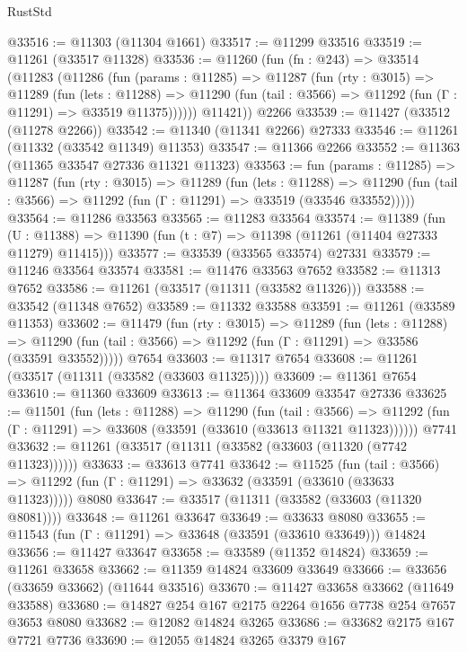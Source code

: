 \begin{lexlean}{RustStd}
\begin{coremodule}
@33516 := @11303 (@11304 @1661)
@33517 := @11299 @33516
@33519 := @11261 (@33517 @11328)
@33536 := @11260
    (fun (fn : @243) =>
    @33514
      (@11283
        (@11286
          (fun (params : @11285) =>
          @11287
            (fun (rty : @3015) =>
            @11289
              (fun (lets : @11288) =>
              @11290 (fun (tail : @3566) => @11292 (fun (Γ : @11291) => @33519 @11375))))))
        @11421))
    @2266
@33539 := @11427 (@33512 (@11278 @2266))
@33542 := @11340 (@11341 @2266) @27333
@33546 := @11261 (@11332 (@33542 @11349) @11353)
@33547 := @11366 @2266
@33552 := @11363 (@11365 @33547 @27336 @11321 @11323)
@33563 := fun (params : @11285) =>
  @11287
    (fun (rty : @3015) =>
    @11289
      (fun (lets : @11288) =>
      @11290 (fun (tail : @3566) => @11292 (fun (Γ : @11291) => @33519 (@33546 @33552)))))
@33564 := @11286 @33563
@33565 := @11283 @33564
@33574 := @11389
    (fun (U : @11388) => @11390 (fun (t : @7) => @11398 (@11261 (@11404 @27333 @11279) @11415)))
@33577 := @33539 (@33565 @33574) @27331
@33579 := @11246 @33564 @33574
@33581 := @11476 @33563 @7652
@33582 := @11313 @7652
@33586 := @11261 (@33517 (@11311 (@33582 @11326)))
@33588 := @33542 (@11348 @7652)
@33589 := @11332 @33588
@33591 := @11261 (@33589 @11353)
@33602 := @11479
    (fun (rty : @3015) =>
    @11289
      (fun (lets : @11288) =>
      @11290 (fun (tail : @3566) => @11292 (fun (Γ : @11291) => @33586 (@33591 @33552)))))
    @7654
@33603 := @11317 @7654
@33608 := @11261 (@33517 (@11311 (@33582 (@33603 @11325))))
@33609 := @11361 @7654
@33610 := @11360 @33609
@33613 := @11364 @33609 @33547 @27336
@33625 := @11501
    (fun (lets : @11288) =>
    @11290
      (fun (tail : @3566) =>
      @11292 (fun (Γ : @11291) => @33608 (@33591 (@33610 (@33613 @11321 @11323))))))
    @7741
@33632 := @11261 (@33517 (@11311 (@33582 (@33603 (@11320 (@7742 @11323))))))
@33633 := @33613 @7741
@33642 := @11525
    (fun (tail : @3566) => @11292 (fun (Γ : @11291) => @33632 (@33591 (@33610 (@33633 @11323)))))
    @8080
@33647 := @33517 (@11311 (@33582 (@33603 (@11320 @8081))))
@33648 := @11261 @33647
@33649 := @33633 @8080
@33655 := @11543 (fun (Γ : @11291) => @33648 (@33591 (@33610 @33649))) @14824
@33656 := @11427 @33647
@33658 := @33589 (@11352 @14824)
@33659 := @11261 @33658
@33662 := @11359 @14824 @33609 @33649
@33666 := @33656 (@33659 @33662) (@11644 @33516)
@33670 := @11427 @33658 @33662 (@11649 @33588)
@33680 := @14827 @254 @167 @2175 @2264 @1656 @7738 @254 @7657 @3653 @8080
@33682 := @12082 @14824 @3265
@33686 := @33682 @2175 @167 @7721 @7736
@33690 := @12055 @14824 @3265 @3379 @167

\end{coremodule}
\end{lexlean}
